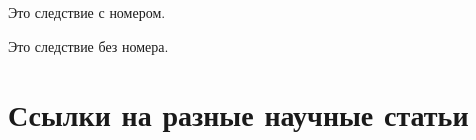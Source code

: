 \documentclass[colorthm, toc]{../civarticle}
\begin{document}
 \Blindtext[11][1]

 \begin{corollary}\label{cor:example:num}
   Это следствие с номером.
   \Blindtext[2]
 \end{corollary}

 \Blindtext[2]

 \begin{corollary*}
   Это следствие без номера.
   \Blindtext[2]
 \end{corollary*}

 \Blindtext[2]


\section{Ссылки на разные научные статьи}
\label{sec:ref-to-articles}

\begin{definition}
  \label{def:001}
  \Blindtext[2]
\end{definition}

\begin{definition*}
  \Blindtext[2]
\end{definition*}

\begin{remark}
  \label{rem:001}
  \Blindtext[2]
\end{remark}

\begin{remark*}
  \Blindtext[2]
\end{remark*}

\begin{example}
  \label{ex:001}
  \Blindtext[2]
\end{example}

\begin{example*}
  \Blindtext[2]
\end{example*}

\begin{task}
  \label{task:001}
  \Blindtext[2]
\end{task}

\begin{task*}
  \Blindtext[2]
\end{task*}

\begin{exercise}
  \label{exer:001}
  \Blindtext[2]
\end{exercise}

\begin{exercise*}
  \Blindtext[2]
\end{exercise*}
\end{document}
